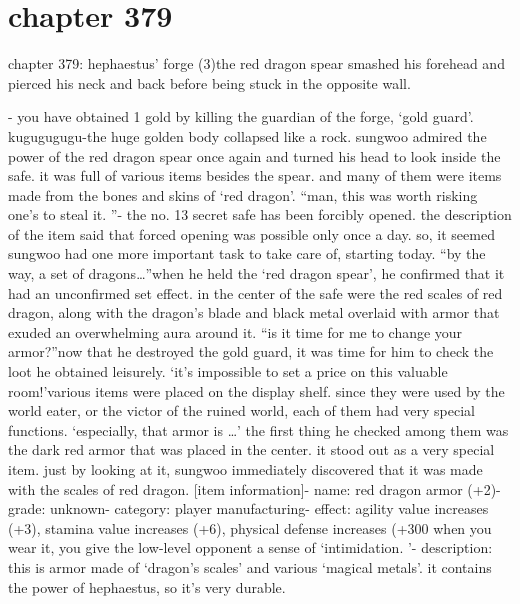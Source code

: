\section{chapter 379}

chapter 379: hephaestus’ forge (3)the red dragon spear smashed his forehead and pierced his neck and back before being stuck in the opposite wall.





- you have obtained 1 gold by killing the guardian of the forge, ‘gold guard’.
kugugugugu-the huge golden body collapsed like a rock.
 sungwoo admired the power of the red dragon spear once again and turned his head to look inside the safe.
it was full of various items besides the spear.
 and many of them were items made from the bones and skins of ‘red dragon’.
“man, this was worth risking one’s to steal it.
”- the no.
 13 secret safe has been forcibly opened.
the description of the item said that forced opening was possible only once a day.
 so, it seemed sungwoo had one more important task to take care of, starting today.
“by the way, a set of dragons…”when he held the ‘red dragon spear’, he confirmed that it had an unconfirmed set effect.
in the center of the safe were the red scales of red dragon, along with the dragon’s blade and black metal overlaid with armor that exuded an overwhelming aura around it.
“is it time for me to change your armor?”now that he destroyed the gold guard, it was time for him to check the loot he obtained leisurely.
‘it’s impossible to set a price on this valuable room!’various items were placed on the display shelf.
 since they were used by the world eater, or the victor of the ruined world, each of them had very special functions.
‘especially, that armor is …’
the first thing he checked among them was the dark red armor that was placed in the center.
it stood out as a very special item.
 just by looking at it, sungwoo immediately discovered that it was made with the scales of red dragon.
[item information]- name: red dragon armor (+2)- grade: unknown- category: player manufacturing- effect: agility value increases (+3), stamina value increases (+6), physical defense increases (+300%
 when you wear it, you give the low-level opponent a sense of ‘intimidation.
’- description: this is armor made of ‘dragon’s scales’ and various ‘magical metals’.
 it contains the power of hephaestus, so it’s very durable.
